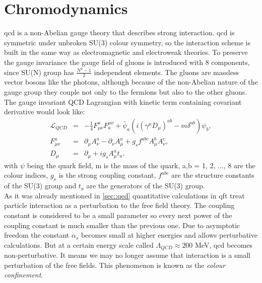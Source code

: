 \section{Chromodynamics}
\gls{qcd} is a non-Abelian gauge theory that describes strong interaction. \gls{qcd} is symmetric under unbroken SU(3) colour symmetry, so the interaction scheme is built in the same way as electromagnetic and electroweak theories. To preserve the gauge invariance the gauge field of gluons is introduced with 8 components, since SU(N) group has $\frac{N^2-1}{2}$ independent elements. The gluons are massless vector bosons like the photons, although because of the non-Abelian nature of the gauge group they couple not only to the fermions but also to the other gluons. The gauge invariant QCD Lagrangian with kinetic term containing covariant derivative would look like:
\begin{equation}
\begin{array}{lll} 
	\mathcal{L}_{QCD} &=& -\frac{1}{4}F^a_{\mu\nu}F_a^{\mu\nu} + \bar\psi_a(i(\gamma^{\mu}D_{\mu})^{ab} - m\delta^{ab})\psi_b,\\
	F^a_{\mu\nu}  &=& \partial_{\mu}A_{\nu}^a-\partial_{\nu}A^a_{\mu}+g_sf^{abc}A^b_{\mu}A^c_{\nu},\\
	D_{\mu} &=& \partial_{\mu} + ig_s A_{\mu}^at_a.
\end{array} 
\end{equation}
with $\psi$ being the quark field, m is the mass of the quark, a,b = 1, 2, ..., 8 are the colour indices, $g_s$ is the strong coupling constant, $f^{abc}$ are the structure constants of the SU(3) group and $t_a$ are the generators of the SU(3) group. \\
As it was already mentioned in \ref{sec::qed} quantitative calculations in \gls{qft} treat particle interaction as a perturbation to the free field theory. The coupling constant is considered to be a small parameter so every next power of the coupling constant is much smaller than the previous one. Due to asymptotic freedom the constant $\alpha_s$ becomes small at higher energies and allows perturbative calculations. But at a certain energy scale called $\Lambda_{QCD}\approx200$ MeV, \gls{qcd} becomes non-perturbative. It means we may no longer assume that interaction is a small perturbation of the free fields. This phenomenon is known as the \textit{colour confinement}.\\


